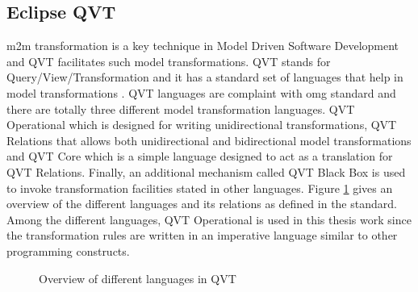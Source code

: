 \subsection{Eclipse QVT}
\gls{m2m} transformation is a key technique in Model Driven Software Development and QVT facilitates such model transformations. QVT stands for Query/View/Transformation and it has a standard set of languages that help in model transformations \cite{eclipseqvt}. QVT languages are complaint with \gls{omg} standard and there are totally three different model transformation languages. QVT Operational which is designed for writing unidirectional transformations, QVT Relations that allows both unidirectional and bidirectional model transformations and QVT Core which is a simple language designed to act as a translation for QVT Relations. Finally, an additional mechanism called QVT Black Box is used to invoke transformation facilities stated in other languages. Figure \ref{fig:overview} gives an overview of the different languages and its relations as defined in the standard. Among the different languages, QVT Operational is used in this thesis work since the transformation rules are written in an imperative language similar to other programming constructs. 

\begin{figure}[htb!]
\centering
{}
\caption{Overview of different languages in QVT}
\label{fig:overview}
\end{figure}

